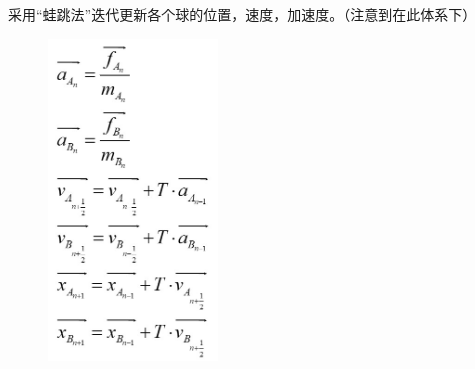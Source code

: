 \documentclass[12pt,a4paper]{ctexart}
\begin{document}
	采用“蛙跳法”迭代更新各个球的位置，速度，加速度。（注意到在此体系下）
	\begin{figure}[htb]
	\centering
	{
		\includegraphics[width=4.5cm]{T54.jpg}}
	\hspace{0in}   

	\end{figure}
\end{document}
